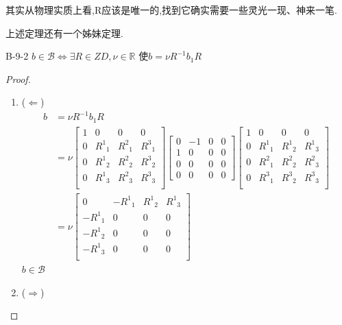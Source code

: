 \documentclass[../main.tex]{subfiles}
\begin{document}
\begin{note}
 其实从物理实质上看,R应该是唯一的,找到它确实需要一些灵光一现、神来一笔. 
\end{note}
上述定理还有一个姊妹定理. 
\begin{theorem}
  {}{B-9-2}  
  $b \in  \mathscr{B} \Leftrightarrow \exists R \in  ZD ,\nu \in  \mathbb{R}$ 使$b = \nu R^{-1}b_1 R$
\end{theorem}
\begin{proof}
  \begin{enumerate}
    \item  ($\Leftarrow$) 
    \begin{align*}
              b &= \nu R^{-1}b_1R \\&= \nu   \begin{bmatrix} 
          1&0&0&0\\
          0&R^1{}_1 & R^2{}_1 & R^3{}_1 \\
          0&R^1{}_2 & R^2{}_2 & R^3{}_2 \\
        0&R^1{}_3 & R^2{}_3 & R^3{}_3 \\ \end{bmatrix} 
\begin{bmatrix} 0 & -1 & 0 & 0\\ 1& 0 & 0 & 0 \\ 0& 0 & 0& 0 \\0&0&0&0 \end{bmatrix} 
        \begin{bmatrix} 
          1&0&0&0\\
          0&R^1{}_1 & R^1{}_2 & R^1{}_3 \\
          0&R^2{}_1 & R^2{}_2 & R^2{}_3 \\
        0&R^3{}_1 & R^3{}_2 & R^3{}_3 \\ \end{bmatrix} \\
           &=\nu 
           \begin{bmatrix} 
             0& - R^{1}{}_{1}& R^{1}{}_{2}& R^{1}{}_{3}\\
             - R^{1}{}_{1}&0&0&0\\
             -R^{1}{}_{2}&0&0&0\\
             -R^{1}{}_{3}&0&0&0\\
           \end{bmatrix} 
    \end{align*}
  $b \in  \mathscr{B}$
\item ($ \Rightarrow$)
  \end{enumerate}


\end{proof}
\end{document}
